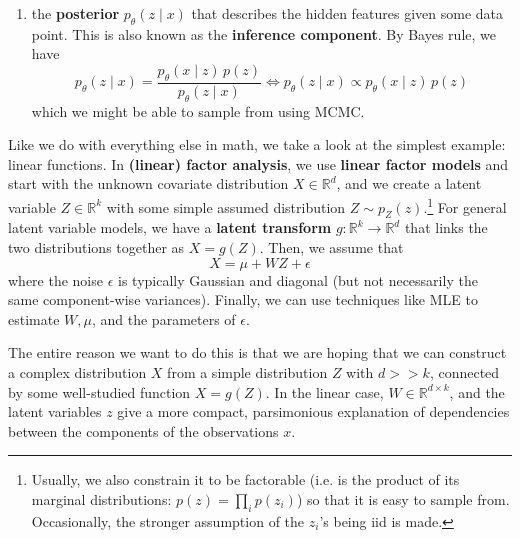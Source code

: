 \begin{definition}
\begin{enumerate}
      \item the \textbf{posterior} $p_\theta (z \mid x)$ that describes the hidden features given some data point. This is also known as the \textbf{inference component}. By Bayes rule, we have 
      \begin{equation}
        p_\theta (z \mid x) = \frac{p_\theta (x \mid z) \, p(z)}{p_\theta (z \mid x)} \iff p_\theta (z \mid x) \propto p_\theta (x \mid z) \, p(z)
      \end{equation}
      which we might be able to sample from using MCMC. 
    \end{enumerate}
  \end{definition} 

  Like we do with everything else in math, we take a look at the simplest example: linear functions. In \textbf{(linear) factor analysis}, we use \textbf{linear factor models} and start with the unknown covariate distribution $X \in \mathbb{R}^d$, and we create a latent variable $Z \in \mathbb{R}^k$ with some simple assumed distribution $Z \sim p_Z (z)$.\footnote{Usually, we also constrain it to be factorable (i.e. is the product of its marginal distributions: $p(z) = \prod_i p(z_i)$) so that it is easy to sample from. Occasionally, the stronger assumption of the $z_i$'s being iid is made.} For general latent variable models, we have a \textbf{latent transform} $g: \mathbb{R}^k \rightarrow \mathbb{R}^d$ that links the two distributions together as $X = g(Z)$. Then, we assume that 
  \begin{equation}
    X = \mu + W Z + \epsilon
  \end{equation}
  where the noise $\epsilon$ is typically Gaussian and diagonal (but not necessarily the same component-wise variances). Finally, we can use techniques like MLE to estimate $W, \mu$, and the parameters of $\epsilon$. 

  The entire reason we want to do this is that we are hoping that we can construct a complex distribution $X$ from a simple distribution $Z$ with $d >> k$, connected by some well-studied function $X = g(Z)$. In the linear case, $W \in \mathbb{R}^{d \times k}$, and the latent variables $z$ give a more compact, parsimonious  explanation of dependencies between the components of the observations $x$. 

